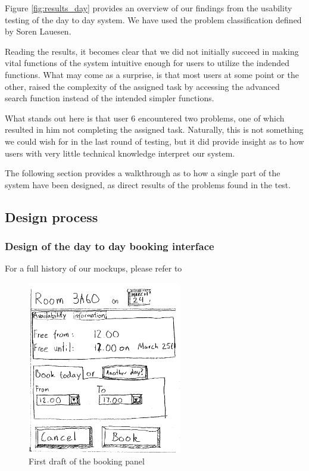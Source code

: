 Figure \ref{fig:results_day} provides an overview of our findings from the usability testing of the day to day system. We have used the problem classification defined by Soren Lauesen\cite{lauesen}.

Reading the results, it becomes clear that we did not initially succeed in making vital functions of the system intuitive enough for users to utilize the indended functions. What may come as a surprise, is that most users at some point or the other, raised the complexity of the assigned task by accessing the advanced search function instead of the intended simpler functions.

What stands out here is that user 6 encountered two problems, one of which resulted in him not completing the assigned task. Naturally, this is not something we could wish for in the last round of testing, but it did provide insight as to how users with very little technical knowledge interpret our system.

The following section provides a walkthrough as to how a single part of the system have been designed, as direct results of the problems found in the test.

\subsection{Design process}
\label{sec:design_process}

\subsubsection{Design of the day to day booking interface}

For a full history of our mockups, please refer to %
\\

\begin{figure}[htb]
\begin{center}
\leavevmode
\includegraphics[width=0.6\textwidth]{images/bookRoomMockup}
\end{center}
\caption{First draft of the booking panel}
\label{fig:book_room_mockup}
\end{figure}

